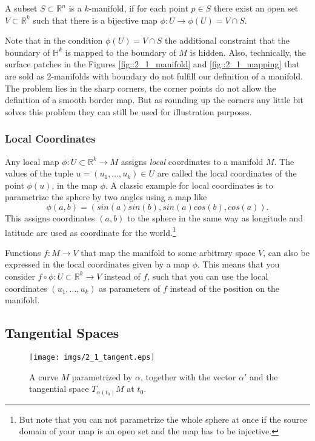 \begin{definition}[Manifold] A subset $S\subset \mathbb R^n$ is a $k$-manifold, if for each point $p \in S$ there exist an open set $V\subset \mathbb R^k$ such that there is a bijective map $\phi: U \rightarrow  \phi(U) = V\cap S$.
\end{definition} 
Note that in the condition $\phi(U) = V \cap S$ the additional constraint that the boundary of $\mathbb H^k$ is mapped to the boundary of $M$ is hidden. Also, technically, the surface patches in the Figures \ref{fig::2_1_manifold} and \ref{fig::2_1_mapping} that are sold as 2-manifolds with boundary do not fulfill our definition of a manifold. The problem lies in the sharp corners, the corner points do not allow the definition of a smooth border map. But as rounding up the corners any little bit solves this problem they can still be used for illustration purposes.

\subsubsection{Local Coordinates}

Any local map $\phi: U \subset \mathbb R^k \rightarrow M$ assigns \emph{local} coordinates to a manifold $M$. The values of the tuple $u=(u_1,...,u_k)\in U$ are called the local coordinates of the point $\phi(u)$, in the map $\phi$. A classic example for local coordinates is to parametrize the sphere by two angles using a map like
\[\phi(a,b) = (sin(a)sin(b), sin(a)cos(b), cos(a)).\]
This assigns coordinates $(a,b)$ to the sphere in the same way as longitude and latitude are used as coordinate for the world.\footnote{But note that you can not parametrize the whole sphere at once if the source domain of your map is an open set and the map has to be injective.}

Functions $f:M \rightarrow V$ that map the manifold to some arbitrary space $V$, can also be expressed in the local coordinates given by  a map $\phi$. This means that you consider $f \circ \phi : U \subset \mathbb R^k \rightarrow V$ instead of $f$, such that you can use the local coordinates $(u_1,...,u_k)$ as parameters of $f$ instead of the position on the manifold. %

	
\subsection{Tangential Spaces}		
\begin{figure}[tb]
\begin{center}
\texttt{[image: imgs/2\_1\_tangent.eps]}
\end{center}
\caption{A curve $M$ parametrized by $\alpha$, together with the vector $\alpha'$ and the tangential space $T_{\alpha(t_0)}M$ at $t_0$.}
\label{fig::2_1_paramCurve}
\end{figure}


